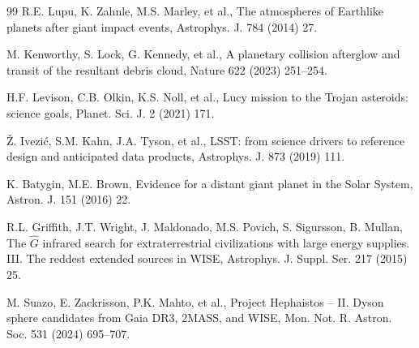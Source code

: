 \documentclass[preprint,12pt]{elsarticle}
\theoremstyle{definition}
\begin{document}
\begin{thebibliography}{99}
 R.E. Lupu, K. Zahnle, M.S. Marley, et al., The atmospheres of Earthlike planets after giant impact events, Astrophys. J. 784 (2014) 27.

 M. Kenworthy, S. Lock, G. Kennedy, et al., A planetary collision afterglow and transit of the resultant debris cloud, Nature 622 (2023) 251--254.

 H.F. Levison, C.B. Olkin, K.S. Noll, et al., Lucy mission to the Trojan asteroids: science goals, Planet. Sci. J. 2 (2021) 171.

 \v{Z}. Ivezi\'c, S.M. Kahn, J.A. Tyson, et al., LSST: from science drivers to reference design and anticipated data products, Astrophys. J. 873 (2019) 111.

 K. Batygin, M.E. Brown, Evidence for a distant giant planet in the Solar System, Astron. J. 151 (2016) 22.

 R.L. Griffith, J.T. Wright, J. Maldonado, M.S. Povich, S. Sigur{\dh}sson, B. Mullan, The $\hat{G}$ infrared search for extraterrestrial civilizations with large energy supplies. III. The reddest extended sources in WISE, Astrophys. J. Suppl. Ser. 217 (2015) 25.

 M. Suazo, E. Zackrisson, P.K. Mahto, et al., Project Hephaistos -- II. Dyson sphere candidates from Gaia DR3, 2MASS, and WISE, Mon. Not. R. Astron. Soc. 531 (2024) 695--707.

\end{thebibliography}
\end{document}
